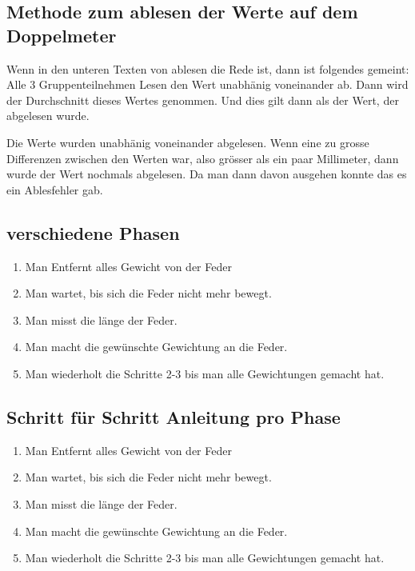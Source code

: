 \documentclass[../main.tex]{subfiles} %
\begin{document}
    \subsection{Methode zum ablesen der Werte auf dem Doppelmeter}\label{subsec:methode-zum-ablesen-der-werte-auf-dem-doppelmeter}

    Wenn in den unteren Texten von ablesen die Rede ist, dann ist folgendes gemeint:
    Alle 3 Gruppenteilnehmen Lesen den Wert unabhänig voneinander ab. Dann wird der Durchschnitt dieses Wertes genommen. Und dies gilt dann als der Wert, der abgelesen wurde.

    \begin{tcolorbox}[title=Hinweis beim Ablesen]
        Die Werte wurden unabhänig voneinander abgelesen.
        Wenn eine zu grosse Differenzen zwischen den Werten war, also grösser als ein paar Millimeter, dann wurde der Wert nochmals abgelesen.
        Da man dann davon ausgehen konnte das es ein Ablesfehler gab.
    \end{tcolorbox}

    
    \subsection{verschiedene Phasen}\label{subsec:schritt-für-schritt-anleitung}
    \begin{enumerate}
        \item Man Entfernt alles Gewicht von der Feder
        \item Man wartet, bis sich die Feder nicht mehr bewegt.
        \item Man misst die länge der Feder.
        \item Man macht die gewünschte Gewichtung an die Feder.
        \item Man wiederholt die Schritte 2-3 bis man alle Gewichtungen gemacht hat.
    \end{enumerate}

    \subsection{Schritt für Schritt Anleitung pro Phase}\label{subsec:schritt-für-schritt-anleitung}
    \begin{enumerate}
        \item Man Entfernt alles Gewicht von der Feder
        \item Man wartet, bis sich die Feder nicht mehr bewegt.
        \item Man misst die länge der Feder.
        \item Man macht die gewünschte Gewichtung an die Feder.
        \item Man wiederholt die Schritte 2-3 bis man alle Gewichtungen gemacht hat.
    \end{enumerate}
\end{document}
